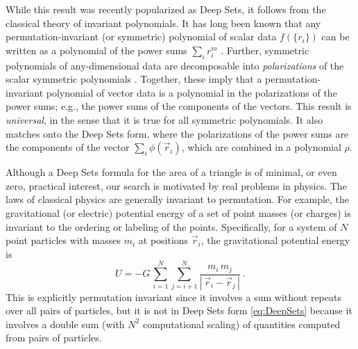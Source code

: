 \documentclass[10pt]{article}
\newcommand{\abs}[1]{|\,{#1}\,|}
\newcommand{\CH}[1]{{\color{blue} (CH says: #1)}}
\newcommand{\Hogg}[1]{{\color{violet} (Hogg says: #1)}}
\begin{document}
While this result was recently popularized as Deep Sets, it follows from the classical theory of invariant polynomials.
It has long been known that any permutation-invariant (or symmetric) polynomial of scalar data $f(\{r_i\})$ can be written as a polynomial of the power sums $\sum_i r_i^m$ \citep{Waring1782}.
Further, symmetric polynomials of any-dimensional data are decomposable into \emph{polarizations} of the scalar symmetric polynomials \citep{Weyl1939}.
Together, these imply that a permutation-invariant polynomial of vector data is a polynomial in the polarizations of the power sums; e.g., the power sums of the components of the vectors.
This result is \emph{universal}, in the sense that it is true for all symmetric polynomials.
It also matches onto the Deep Sets form, where the polarizations of the power sums are the components of the vector $\sum_i \phi(\vec{r}_i)$, which are combined in a polynomial $\rho$.


Although a Deep Sets formula for the area of a triangle is of minimal, or even zero, practical interest, our search is motivated by real problems in physics.
The laws of classical physics are generally invariant to permutation.
For example, the gravitational (or electric) potential energy of a set of point masses (or charges) is invariant to the ordering or labeling of the points. 
Specifically, for a system of $N$ point particles with masses $m_i$ at positions $\vec{r}_i$, the gravitational potential energy is
\begin{equation}
    U = -G \, \sum_{i=1}^{N} \sum_{j=i+1}^{N} \frac{m_i \, m_j}{\abs{\vec{r}_i - \vec{r}_j}} ~.
\end{equation}
This is explicitly permutation invariant since it involves a sum without repeats over all pairs of particles, but it is not in Deep Sets form \eqref{eq:DeepSets} because it involves a double sum (with $N^2$ computational scaling) of quantities computed from pairs of particles.
\end{document}
